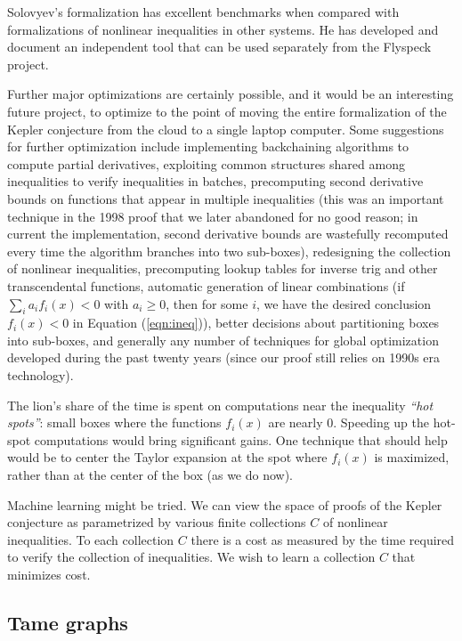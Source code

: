 \documentclass{amsart}
\begin{document}
Solovyev's formalization has excellent benchmarks
when compared with formalizations of nonlinear inequalities in
other systems.  He has developed and document an independent tool
that can be used separately from the Flyspeck project.

Further major optimizations are certainly possible, and it would be an
interesting future project, to optimize to the point of moving the
entire formalization of the Kepler conjecture from the cloud to a
single laptop computer.  Some suggestions for further optimization
include implementing backchaining algorithms to compute partial
derivatives, exploiting common structures shared among inequalities to
verify inequalities in batches, precomputing second derivative bounds
on functions that appear in multiple inequalities (this was an
important technique in the 1998 proof that we later abandoned for no
good reason; in current the implementation, second derivative bounds
are wastefully recomputed every time the algorithm branches into two
sub-boxes), redesigning the collection of nonlinear inequalities,
precomputing lookup tables for inverse trig and other transcendental
functions, automatic generation of linear combinations (if $\sum_i a_i
f_i(x) < 0$ with $a_i\ge 0$, then for some $i$, we have the desired
conclusion $f_i(x) < 0$ in Equation (\ref{eqn:ineq})), better
decisions about partitioning boxes into sub-boxes, and generally any
number of techniques for global optimization developed during the past
twenty years (since our proof still relies on 1990s era technology).


The lion's share of the time is spent on computations near the
inequality \emph{``hot spots''}: small boxes where the functions
$f_i(x)$ are nearly $0$.  Speeding up the hot-spot computations would
bring significant gains.  One technique that should help would be to
center the Taylor expansion at the spot where $f_i(x)$ is maximized,
rather than at the center of the box (as we do now).

Machine learning might be tried.  We can view the space of proofs of
the Kepler conjecture as parametrized by various finite collections
$C$ of nonlinear inequalities.  To each collection $C$ there is a cost
as measured by the time required to verify the collection of
inequalities.  We wish to learn a collection $C$ that minimizes cost.

\subsection{Tame graphs}
\end{document}
